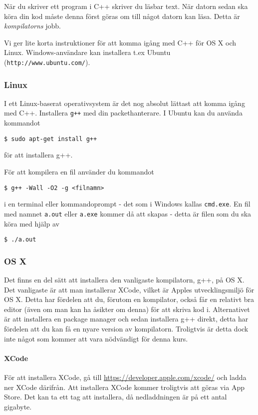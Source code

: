 När du skriver ett program i C++ skriver du läsbar text. När datorn sedan ska köra din kod måste denna först göras om till något datorn kan läsa. Detta är \emph{kompilatorns} jobb.

Vi ger lite korta instruktioner för att komma igång med C++ för OS X och Linux. Windows-användare kan installera t.ex Ubuntu (\texttt{http://www.ubuntu.com/}).

\subsubsection{Linux}
I ett Linux-baserat operativsystem är det nog absolut lättast att komma igång med C++. Installera \texttt{g++} med din packethanterare. I Ubuntu kan du använda kommandot

\texttt{\$ sudo apt-get install g++}

för att installera g++.

För att kompilera en fil använder du kommandot

\texttt{\$ g++ -Wall -O2 -g <filnamn>}

i en terminal eller kommandoprompt - det som i Windows kallas \texttt{cmd.exe}. En fil med namnet \texttt{a.out} eller \texttt{a.exe} kommer då att skapas - detta är filen som du ska köra med hjälp av

\texttt{\$ ./a.out}


\subsubsection{OS X}

Det finns en del sätt att installera den vanligaste kompilatorn, g++, på OS X. Det vanligaste är att man installerar XCode, vilket är Apples utvecklingsmiljö för OS X. Detta har fördelen att du, förutom en kompilator, också får en relativt bra editor (även om man kan ha åsikter om denna) för att skriva kod i. Alternativet är att installera en package manager och sedan installera g++ direkt, detta har fördelen att du kan få en nyare version av kompilatorn. Troligtvis är detta dock inte något som kommer att vara nödvändigt för denna kurs.

\paragraph{XCode}
För att installera XCode, gå till \url{https://developer.apple.com/xcode/} och ladda ner XCode därifrån. Att installera XCode kommer troligtvis att göras via App Store. Det kan ta ett tag att installera, då nedladdningen är på ett antal gigabyte.

